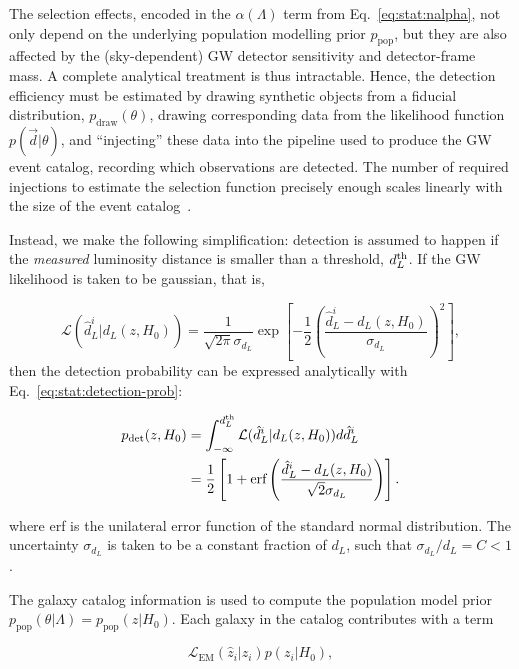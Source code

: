 \documentclass[%
preprint,
nofootinbib,
 amsmath,amssymb,
 aps,
]{revtex4-2}
\newcommand{\given}[2]{p( #1 | #2 )}
\newcommand{\ppop}[0]{p_{\text{pop}}}
\newcommand{\pdet}[0]{p_{\text{det}}}
\begin{document}
The selection effects, encoded in the $\alpha (\Lambda )$ term from Eq.~\eqref{eq:stat:nalpha}, not
only depend on the underlying population modelling prior $\ppop$, but they are also affected by the
(sky-dependent) GW detector sensitivity and detector-frame mass. A complete analytical treatment is
thus intractable. Hence, the detection efficiency must be estimated by drawing synthetic objects
from a fiducial distribution, $p_\text{draw}(\theta)$, drawing corresponding data from the
likelihood function $\given{\vec{d}}{\theta}$, and “injecting” these data into the pipeline used to
produce the GW event catalog, recording which observations are detected. The number of required
injections to estimate the selection function precisely enough scales linearly with the size of the
event catalog~\cite{essick2022precision}.

Instead, we make the following simplification: detection is assumed to happen if the
\textit{measured} luminosity distance is smaller than a threshold, $d_L^{\rm{th}}$. If the GW
likelihood is taken to be gaussian, that is,

\begin{equation}
	\label{eq:stat:gw-gaussian-likelihood}
	\mathcal{L}(\hat{d}_L^i | d_L(z, H_0))
	= \frac{1}{\sqrt{2 \pi} \sigma_{d_L}} \exp{\left [-\frac{1}{2} \left (\frac{\hat{d}_L^i - d_L(z, H_0)}{\sigma_{d_L}} \right )^2 \right ]},
\end{equation}
then the detection probability can be expressed analytically with Eq.~\eqref{eq:stat:detection-prob}:

\begin{align}
	\nonumber
	\pdet(z, H_0) & = \int_{-\infty}^{d_L^{\rm{th}}} \mathcal{L}(\hat{d}_L^i | d_L(z, H_0)) d \hat{d}_L^i                                    \\
	              & = \frac{1}{2} \left [ 1 + \text{erf} \left (\frac{\hat{d}_L^i - d_L(z, H_0)}{ \sqrt{2} \sigma_{d_L}}  \right ) \right ].
\end{align}

where erf is the unilateral error function of the standard normal distribution. The uncertainty
$\sigma_{d_L}$ is taken to be a constant fraction of $d_L$, such that $\sigma_{d_L} / d_L = C < 1$.

The galaxy catalog information is used to compute the population model prior $\ppop(\theta |
	\Lambda) = \ppop(z | H_0)$. Each galaxy in the catalog contributes with a term

\begin{equation}
	\mathcal{L}_\text{EM}(\hat{z}_i | z_i)p(z_i | H_0),
\end{equation}
\end{document}

